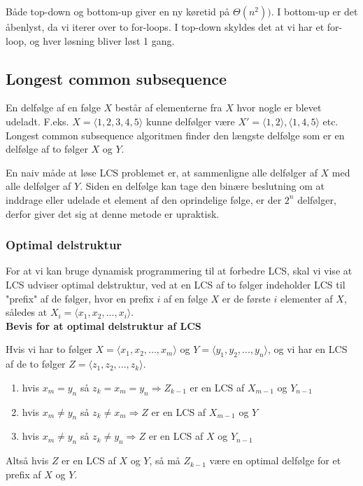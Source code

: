 Både top-down og bottom-up giver en ny køretid på $\Theta(n^2))$. I bottom-up er det åbenlyst, da vi iterer over to for-loops. I top-down skyldes det at vi har et for-loop, og hver løsning bliver løst 1 gang.\\



\subsection{Longest common subsequence}
En delfølge af en følge $X$ består af elementerne fra $X$ hvor nogle er blevet udeladt. F.eks. $X= \langle 1, 2, 3, 4, 5\rangle$ kunne delfølger være $X' = {\langle 1, 2\rangle}, \langle 1, 4, 5\rangle$ etc.\\

Longest common subsequence algoritmen finder den længste delfølge som er en delfølge af to følger $X$ og $Y$.

En naiv måde at løse LCS problemet er, at sammenligne alle delfølger af $X$ med alle delfølger af $Y$.
Siden en delfølge kan tage den binære beslutning om at inddrage eller udelade et element af den oprindelige følge, er der $2^n$ delfølger, derfor giver det sig at denne metode er upraktisk.

\subsubsection{Optimal delstruktur}
For at vi kan bruge dynamisk programmering til at forbedre LCS, skal vi vise at LCS udviser optimal delstruktur, ved at en LCS af to følger indeholder LCS til "prefix" af de følger, hvor en prefix $i$ af en følge $X$ er de første $i$ elementer af $X$, således at $X_i = \langle x_1, x_2, ..., x_i\rangle$.\\

\textbf{Bevis for at optimal delstruktur af LCS}\\
\begin{theorem}
Hvis vi har to følger $X = \langle x_1, x_2, ..., x_m \rangle$ og $Y = \langle y_1, y_2, ..., y_n \rangle$, og vi har en LCS af de to følger $Z = \langle z_1, z_2, ..., z_k\rangle$.
\begin{enumerate}
\item hvis $x_m = y_n$ så $z_k = x_m = y_n \Rightarrow Z_{k-1}$ er en LCS af $X_{m-1}$ og $Y_{n-1}$
\item hvis $x_m \neq y_n$ så $z_k \neq x_m \Rightarrow Z$ er en LCS af $X_{m-1}$ og $Y$
\item hvis $x_m \neq y_n$ så $z_k \neq y_n \Rightarrow Z$ er en LCS af $X$ og $Y_{n-1}$
\end{enumerate}
\end{theorem}
Altså hvis $Z$ er en LCS af $X$ og $Y$, så må $Z_{k-1}$ være en optimal delfølge for et prefix af $X$ og $Y$. \\

